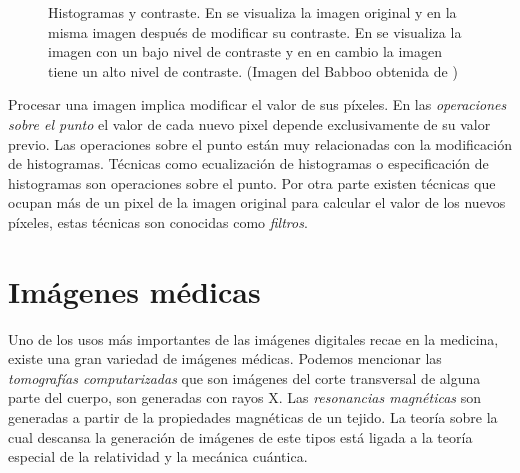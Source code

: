 \begin{figure}[h]
    \centering



  \caption[Histogramas y contraste]{Histogramas y contraste. En
  \protect{} se visualiza la imagen original y en
  \protect{} la misma imagen después de modificar su contraste. En
  \protect{} se visualiza la imagen con un bajo nivel de contraste
  y en \protect{} en cambio la imagen tiene un alto nivel de
  contraste. (Imagen del Babboo obtenida de \cite{sipi})}
  \label{fig:histogramstwo}
\end{figure}

Procesar una imagen implica modificar el valor de sus píxeles. En las
\textit{operaciones sobre el punto} el valor de cada nuevo pixel depende
exclusivamente de su valor previo. Las operaciones sobre el punto están muy
relacionadas con la modificación de histogramas. Técnicas como ecualización de
histogramas o especificación de histogramas son operaciones sobre el punto. Por
otra parte existen técnicas que ocupan más de un pixel de la imagen original
para calcular el valor de los nuevos píxeles, estas técnicas son conocidas como
\textit{filtros}.

\section{Imágenes médicas}

Uno de los usos más importantes de las imágenes digitales recae en la medicina,
existe una gran variedad de imágenes médicas. Podemos mencionar las
\textit{tomografías computarizadas} que son imágenes del corte transversal de
alguna parte del cuerpo, son generadas con rayos X. Las \textit{resonancias
magnéticas} son generadas a partir de la propiedades magnéticas de un tejido.
La teoría sobre la cual descansa la generación de imágenes de este tipos está
ligada a la teoría especial de la relatividad y la mecánica cuántica.

